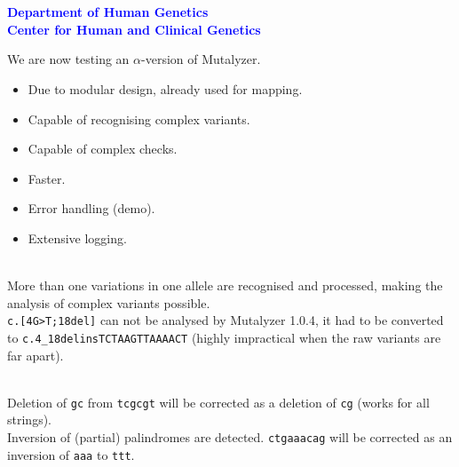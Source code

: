 \documentclass[a4, portrait]{seminar}
\begin{document}

\begin{slide}
\setcounter{slide}{0}
\vspace*{1.5cm}
\begin{center}
{\bf\Large{\myTitle}}\\
\vfill
\textcolor{Blue}{
  {\bf
    \small{\me}\\
    \small{Department of Human Genetics}\\
    \small{Center for Human and Clinical Genetics}
  }
}
\vspace{1.1cm}
\end{center}
\end{slide}



\begin{slide}
\begin{center}
We are now testing an $\alpha$-version of Mutalyzer.
\end{center}
\vspace*{1cm}
\begin{itemize}
\item Due to modular design, already used for mapping.
\item Capable of recognising complex variants.
\item Capable of complex checks.
\item Faster.
\item Error handling (demo).
\item Extensive logging.
\end{itemize}
\vfill
\end{slide}

\begin{slide}
\vspace*{1cm}\\
More than one variations in one allele are recognised and processed, making the
analysis of complex variants possible.
\vspace*{1cm}\\
\texttt{c.[4G>T;18del]} can not be analysed by Mutalyzer 1.0.4, it had to be 
converted to \texttt{c.4\_18delinsTCTAAGTTAAAACT} (highly impractical when 
the raw variants are far apart).
\vfill
\end{slide}

\begin{slide}
\vspace*{1cm}\\
Deletion of \texttt{gc} from \texttt{tcgcgt} will be corrected as a deletion of
\texttt{cg} (works for all strings).
\vspace*{1cm}\\
Inversion of (partial) palindromes are detected. \texttt{ctgaaacag} will be 
corrected as an inversion of \texttt{aaa} to \texttt{ttt}.
\vfill
\end{slide}
\end{document}
